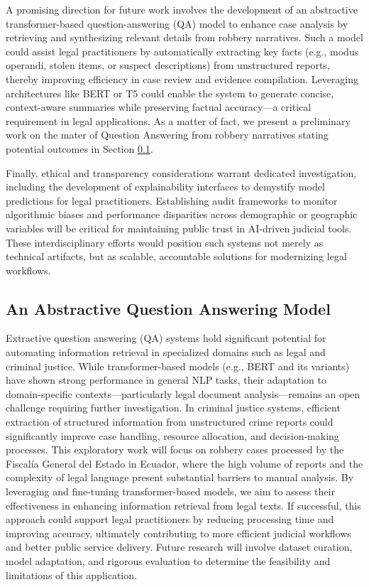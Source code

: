 \documentclass[onecolumn, journal, english, 12pt, a4paper]{IEEEtran} %
\theoremstyle{definition}
\begin{document}
A promising direction for future work involves the development of an
abstractive transformer-based question-answering (QA) model to enhance
case analysis by retrieving and synthesizing relevant details from
robbery narratives. Such a model could assist legal practitioners by
automatically extracting key facts (e.g., modus operandi, stolen
items, or suspect descriptions) from unstructured reports, thereby
improving efficiency in case review and evidence
compilation. Leveraging architectures like BERT \cite{devlin2018bert}
or T5 \cite{raffel2023T5} could enable the system to generate concise,
context-aware summaries while preserving factual accuracy—a critical
requirement in legal applications. As a matter of fact, we present a
preliminary work on the mater of Question Answering from robbery
narratives stating potential outcomes in Section
\ref{sec:an-abstr-qa-model}.

Finally, ethical and
transparency considerations warrant dedicated investigation, including
the development of explainability interfaces to demystify model
predictions for legal practitioners. Establishing audit frameworks to
monitor algorithmic biases and performance disparities across
demographic or geographic variables will be critical for maintaining
public trust in AI-driven judicial tools. These interdisciplinary
efforts would position such systems not merely as technical artifacts,
but as scalable, accountable solutions for modernizing legal
workflows.

\subsection{An Abstractive Question Answering Model}
\label{sec:an-abstr-qa-model}

Extractive question answering (QA) systems hold significant potential
for automating information retrieval in specialized domains such as
legal and criminal justice. While transformer-based models (e.g., BERT
and its variants) have shown strong performance in general NLP tasks,
their adaptation to domain-specific contexts—particularly legal
document analysis—remains an open challenge requiring further
investigation. In criminal justice systems, efficient extraction of
structured information from unstructured crime reports could
significantly improve case handling, resource allocation, and
decision-making processes. This exploratory work will focus on robbery
cases processed by the Fiscalía General del Estado in Ecuador, where
the high volume of reports and the complexity of legal language
present substantial barriers to manual analysis. By leveraging and
fine-tuning transformer-based models, we aim to assess their
effectiveness in enhancing information retrieval from legal texts. If
successful, this approach could support legal practitioners by
reducing processing time and improving accuracy, ultimately
contributing to more efficient judicial workflows and better public
service delivery. Future research will involve dataset curation, model
adaptation, and rigorous evaluation to determine the feasibility and
limitations of this application.
\end{document}
